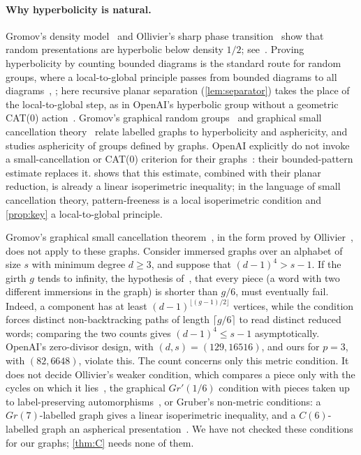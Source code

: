 \documentclass[11pt]{article}
\theoremstyle{definition}
\theoremstyle{plain}
\begin{document}
\paragraph{Why hyperbolicity is natural.} Gromov's density model~\cite{Gromov1993} and Ollivier's sharp phase transition~\cite{Ollivier2004} show that random presentations are hyperbolic below density $1/2$; see~\cite{Ollivier2005}. Proving hyperbolicity by counting bounded diagrams is the standard route for random groups, where a local-to-global principle passes from bounded diagrams to all diagrams~\cite[9.B]{Gromov1993}, \cite{Ollivier2004}; here recursive planar separation (\cref{lem:separator}) takes the place of the local-to-global step, as in OpenAI's hyperbolic group without a geometric CAT(0) action~\cite[Thm.~3.1]{OAI257}. Gromov's graphical random groups~\cite{Gromov2003} and graphical small cancellation theory~\cite{Ollivier2006,Gruber2015} relate labelled graphs to hyperbolicity and asphericity, and~\cite{Bereznyuk2019} studies asphericity of groups defined by graphs. OpenAI explicitly do not invoke a small-cancellation or CAT(0) criterion for their graphs~\cite[\S1]{OAI196}: their bounded-pattern estimate replaces it.  shows that this estimate, combined with their planar reduction, is already a linear isoperimetric inequality; in the language of small cancellation theory, pattern-freeness is a local isoperimetric condition and \cref{prop:key} a local-to-global principle.

Gromov's graphical small cancellation theorem~\cite{Gromov2003}, in the form proved by Ollivier~\cite[Thm.~1]{Ollivier2006}, does not apply to these graphs. Consider immersed graphs over an alphabet of size $s$ with minimum degree $d\ge3$, and suppose that $(d-1)^4>s-1$. If the girth $g$ tends to infinity, the hypothesis of~\cite[Thm.~1]{Ollivier2006}, that every piece (a word with two different immersions in the graph) is shorter than $g/6$, must eventually fail. Indeed, a component has at least $(d-1)^{\lfloor(g-1)/2\rfloor}$ vertices, while the condition forces distinct non-backtracking paths of length $\lceil g/6\rceil$ to read distinct reduced words; comparing the two counts gives $(d-1)^4\le s-1$ asymptotically. OpenAI's zero-divisor design, with $(d,s)=(129,16516)$, and ours for $p=3$, with $(82,6648)$, violate this. The count concerns only this metric condition. It does not decide Ollivier's weaker condition, which compares a piece only with the cycles on which it lies~\cite[Remark~2]{Ollivier2006}, the graphical $Gr'(1/6)$ condition with pieces taken up to label-preserving automorphisms~\cite{GruberMartinSteenbock2015}, or Gruber's non-metric conditions: a $Gr(7)$-labelled graph gives a linear isoperimetric inequality, and a $C(6)$-labelled graph an aspherical presentation~\cite[Thms.~2.16 and~2.18]{Gruber2015}. We have not checked these conditions for our graphs; \cref{thm:C} needs none of them.
\end{document}
